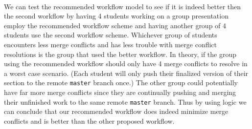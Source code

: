 \documentclass[12pt]{article}
\begin{document}
\paragraph{} We can test the recommended workflow model to see if it is indeed better then the second workflow by  having 4 students working on a group presentation employ the recommended workflow scheme and having another group of 4 students use the second workflow scheme. Whichever group of students encounters less merge conflicts and has less trouble with merge conflict resolutions is the group that used the better workflow. In theory, if the group using the recommended workflow should only have 4 merge conflicts to resolve in a worst case scenario. (Each student will only push their finalized version of their section to the remote \texttt{master} branch once.) The other group could potentially have far more merge conflicts since they are continually pushing and merging their unfinished work to the same remote \texttt{master} branch. Thus by using logic we can conclude that our recommended workflow does indeed minimize merge conflicts and is better than the other proposed workflow. 
\end{document}
